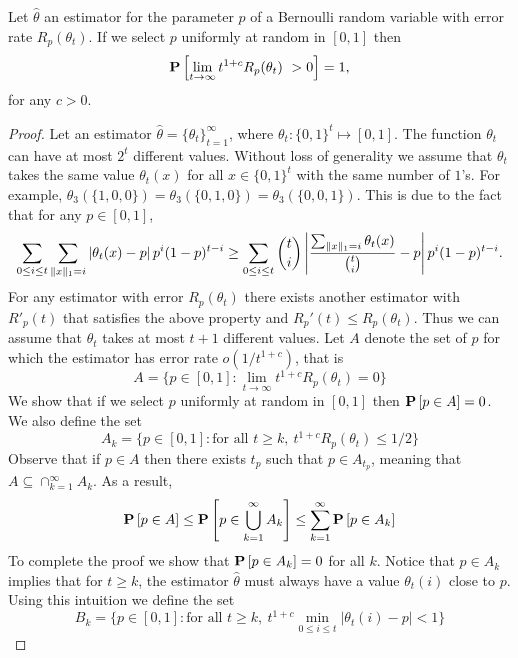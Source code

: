 \begin{lemma}\label{l:estimation_lower_bound}

  Let $\hat{\theta}$ an estimator for the parameter $p$ of a Bernoulli
  random variable with error rate $R_p(\theta_t)$.
  If we select $p$ uniformly at random in $[0,1]$ then
  \[
    \Prob{\lim_{t\to \infty} t^{1+c} R_p(\theta_t)\ > 0}=1,
  \]
  for any $c>0$.

\end{lemma}
\begin{proof}

  Let an estimator $\hat{\theta} = \{\theta_t\}_{t=1}^{\infty}$, where
  $\theta_t: \{0,1\}^t\mapsto [0,1]$.  The function $\theta_t$ can have at most
  $2^t$ different values. Without loss of generality we assume that
  $\theta_t$ takes the same value $\theta_t(x)$ for all $x \in \{0,1\}^t$
  with the same number of $1$'s. For example,
  $\theta_3(\{1,0,0\})=\theta_3(\{0,1,0\})=\theta_3(\{0,0,1\})$.
  This is due to the fact that for any $p \in[0,1]$,
  \[
    \sum_{0 \leq i \leq t} \sum_{\norm{1}{x} = i} \lp| \theta_t(x) - p \rp|
    p^i (1-p)^{t-i} \geq \sum_{0 \leq i \leq t} \binom{t}{i} \lp|
    \frac{\sum_{\norm{1}{x} = i} \theta_t(x)}{\binom{t}{i}}  - p \rp| p^i
    (1-p)^{t-i}.
  \]
  For any estimator with error $R_p(\theta_t)$ there exists another estimator
  with $R'_p(t)$ that satisfies the above property and
  $R_p'(t) \leq R_p(\theta_t)$.
  Thus we can assume that $\theta_t$ takes at most $t+1$ different
  values.
  Let $A$ denote the set of $p$ for which the estimator has error
  rate $o(1/t^{1+c})$, that is
  \[
    A= \{p\in [0,1]: \lim_{t \to \infty} t^{1+c}R_p(\theta_t)=0\}
  \]
  We show that if we select $p$ uniformly at random in $[0,1]$ then
  $\Prob{p \in A} = 0$.  We also define the set
  \[
    A_k=\{p\in [0,1]: \text{for all }t \geq k,~ t^{1+c}R_p(\theta_t)\leq 1/2\}
  \]
  Observe that if $p \in A$ then there exists $t_p$ such that
  $p \in A_{t_p}$, meaning that
  $A \subseteq \cap_{k=1}^{\infty}A_k$.  As a result,
  \[
    \Prob{p \in A} \leq \Prob {p \in\bigcup_{k=1}^{\infty}A_k} \leq
    \sum_{k=1}^{\infty}\Prob{p \in A_k}
  \]
  To complete the proof we show that $\Prob{p \in A_k}=0$ for all $k$.
  Notice that $p \in A_k$ implies that for $t \geq k$, the estimator
  $\hat{\theta}$ must always have a value $\theta_t(i)$ close to $p$.
  Using this intuition we define the set
  \[
    B_k = \{p \in [0,1]: \text{for all
    }t\geq k,~ t^{1+c}\min_{0\leq i \leq t}|\theta_t(i)-p| < 1\}
  \]


\end{proof}
